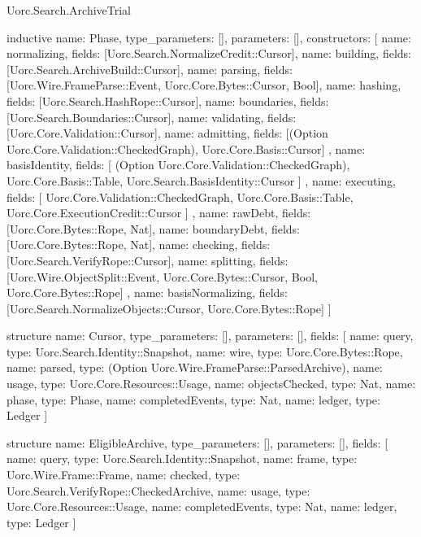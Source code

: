 \begin{lexlean}{Uorc.Search.ArchiveTrial}
\begin{semanticmodule}
inductive{
  name: Phase,
  type_parameters: [],
  parameters: [],
  constructors: [
    {name: normalizing, fields: [Uorc.Search.NormalizeCredit::Cursor]},
    {name: building, fields: [Uorc.Search.ArchiveBuild::Cursor]},
    {name: parsing, fields: [Uorc.Wire.FrameParse::Event, Uorc.Core.Bytes::Cursor, Bool]},
    {name: hashing, fields: [Uorc.Search.HashRope::Cursor]},
    {name: boundaries, fields: [Uorc.Search.Boundaries::Cursor]},
    {name: validating, fields: [Uorc.Core.Validation::Cursor]},
    {
      name: admitting,
      fields: [(Option Uorc.Core.Validation::CheckedGraph), Uorc.Core.Basis::Cursor]
    },
    {
      name: basisIdentity,
      fields: [
        (Option Uorc.Core.Validation::CheckedGraph),
        Uorc.Core.Basis::Table,
        Uorc.Search.BasisIdentity::Cursor
      ]
    },
    {
      name: executing,
      fields: [
        Uorc.Core.Validation::CheckedGraph,
        Uorc.Core.Basis::Table,
        Uorc.Core.ExecutionCredit::Cursor
      ]
    },
    {name: rawDebt, fields: [Uorc.Core.Bytes::Rope, Nat]},
    {name: boundaryDebt, fields: [Uorc.Core.Bytes::Rope, Nat]},
    {name: checking, fields: [Uorc.Search.VerifyRope::Cursor]},
    {
      name: splitting,
      fields: [Uorc.Wire.ObjectSplit::Event, Uorc.Core.Bytes::Cursor, Bool, Uorc.Core.Bytes::Rope]
    },
    {name: basisNormalizing, fields: [Uorc.Search.NormalizeObjects::Cursor, Uorc.Core.Bytes::Rope]}
  ]
}

structure{
  name: Cursor,
  type_parameters: [],
  parameters: [],
  fields: [
    {name: query, type: Uorc.Search.Identity::Snapshot},
    {name: wire, type: Uorc.Core.Bytes::Rope},
    {name: parsed, type: (Option Uorc.Wire.FrameParse::ParsedArchive)},
    {name: usage, type: Uorc.Core.Resources::Usage},
    {name: objectsChecked, type: Nat},
    {name: phase, type: Phase},
    {name: completedEvents, type: Nat},
    {name: ledger, type: Ledger}
  ]
}

structure{
  name: EligibleArchive,
  type_parameters: [],
  parameters: [],
  fields: [
    {name: query, type: Uorc.Search.Identity::Snapshot},
    {name: frame, type: Uorc.Wire.Frame::Frame},
    {name: checked, type: Uorc.Search.VerifyRope::CheckedArchive},
    {name: usage, type: Uorc.Core.Resources::Usage},
    {name: completedEvents, type: Nat},
    {name: ledger, type: Ledger}
  ]
}


\end{semanticmodule}
\end{lexlean}
